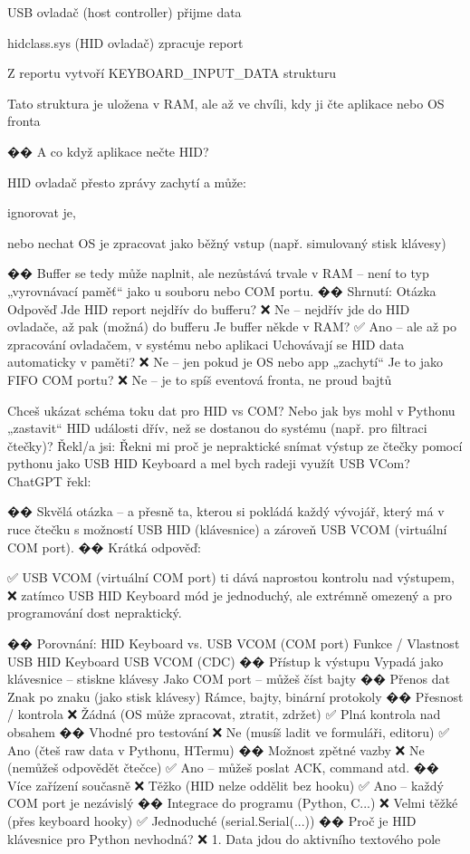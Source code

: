     USB ovladač (host controller) přijme data

    hidclass.sys (HID ovladač) zpracuje report

    Z reportu vytvoří KEYBOARD_INPUT_DATA strukturu

    Tato struktura je uložena v RAM, ale až ve chvíli, kdy ji čte aplikace nebo OS fronta

�� A co když aplikace nečte HID?

    HID ovladač přesto zprávy zachytí a může:

        ignorovat je,

        nebo nechat OS je zpracovat jako běžný vstup (např. simulovaný stisk klávesy)

�� Buffer se tedy může naplnit, ale nezůstává trvale v RAM – není to typ „vyrovnávací paměť“ jako u souboru nebo COM portu.
�� Shrnutí:
Otázka	Odpověď
Jde HID report nejdřív do bufferu?	❌ Ne – nejdřív jde do HID ovladače, až pak (možná) do bufferu
Je buffer někde v RAM?	✅ Ano – ale až po zpracování ovladačem, v systému nebo aplikaci
Uchovávají se HID data automaticky v paměti?	❌ Ne – jen pokud je OS nebo app „zachytí“
Je to jako FIFO COM portu?	❌ Ne – je to spíš eventová fronta, ne proud bajtů

Chceš ukázat schéma toku dat pro HID vs COM? Nebo jak bys mohl v Pythonu „zastavit“ HID události dřív, než se dostanou do systému (např. pro filtraci čtečky)?
Řekl/a jsi:
Řekni mi proč je nepraktické snímat výstup ze čtečky pomocí pythonu jako USB HID Keyboard a mel bych radeji využít USB VCom?
ChatGPT řekl:

�� Skvělá otázka – a přesně ta, kterou si pokládá každý vývojář, který má v ruce čtečku s možností USB HID (klávesnice) a zároveň USB VCOM (virtuální COM port).
�� Krátká odpověď:

    ✅ USB VCOM (virtuální COM port) ti dává naprostou kontrolu nad výstupem,
    ❌ zatímco USB HID Keyboard mód je jednoduchý, ale extrémně omezený a pro programování dost nepraktický.

�� Porovnání: HID Keyboard vs. USB VCOM (COM port)
Funkce / Vlastnost	USB HID Keyboard	USB VCOM (CDC)
�� Přístup k výstupu	Vypadá jako klávesnice – stiskne klávesy	Jako COM port – můžeš číst bajty
�� Přenos dat	Znak po znaku (jako stisk klávesy)	Rámce, bajty, binární protokoly
�� Přesnost / kontrola	❌ Žádná (OS může zpracovat, ztratit, zdržet)	✅ Plná kontrola nad obsahem
�� Vhodné pro testování	❌ Ne (musíš ladit ve formuláři, editoru)	✅ Ano (čteš raw data v Pythonu, HTermu)
�� Možnost zpětné vazby	❌ Ne (nemůžeš odpovědět čtečce)	✅ Ano – můžeš poslat ACK, command atd.
�� Více zařízení současně	❌ Těžko (HID nelze oddělit bez hooku)	✅ Ano – každý COM port je nezávislý
�� Integrace do programu (Python, C...)	❌ Velmi těžké (přes keyboard hooky)	✅ Jednoduché (serial.Serial(...))
�� Proč je HID klávesnice pro Python nevhodná?
❌ 1. Data jdou do aktivního textového pole

